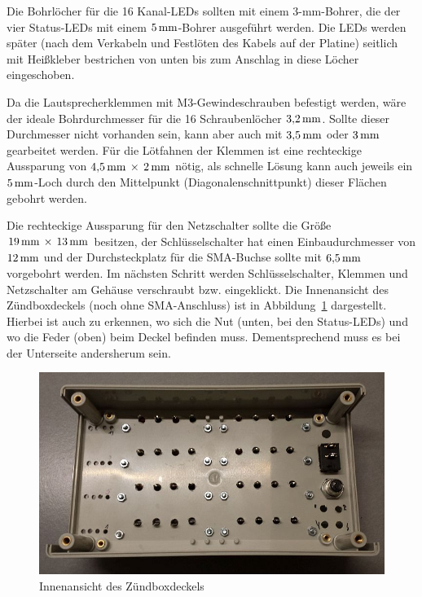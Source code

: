 \documentclass[pdftex, parskip, numbers=noenddot, toc=listof]{scrbook}
\begin{document}
	Die Bohrlöcher für die 16 Kanal-LEDs sollten mit einem 3-mm-Bohrer, die der vier Status-LEDs mit einem $\unit[5]{mm}$-Bohrer ausgeführt werden. Die LEDs werden später (nach dem Verkabeln und Festlöten des Kabels auf der Platine) seitlich mit Heißkleber bestrichen von unten bis zum Anschlag in diese Löcher eingeschoben.

	Da die Lautsprecherklemmen mit M3-Gewindeschrauben befestigt werden, wäre der ideale Bohrdurchmesser für die 16 Schraubenlöcher $\unit[3{,}2]{mm}$. Sollte dieser Durchmesser nicht vorhanden sein, kann aber auch mit $\unit[3{,}5]{mm}$ oder $\unit[3]{mm}$ gearbeitet werden. Für die Lötfahnen der Klemmen ist eine rechteckige Aussparung von $\unit[4{,}5]{mm}\,\times\,\unit[2]{mm}$ nötig, als schnelle Lösung kann auch jeweils ein $\unit[5]{mm}$-Loch durch den Mittelpunkt (Diagonalenschnittpunkt) dieser Flächen gebohrt werden.

	Die rechteckige Aussparung für den Netzschalter sollte die Größe $\unit[19]{mm}\,\times\,\unit[13]{mm}$ besitzen, der Schlüsselschalter hat einen Einbaudurchmesser von $\unit[12]{mm}$ und der Durchsteckplatz für die SMA-Buchse sollte mit $\unit[6{,}5]{mm}$ vorgebohrt werden. Im nächsten Schritt werden Schlüsselschalter, Klemmen und Netzschalter am Gehäuse verschraubt bzw. eingeklickt. Die Innenansicht des Zündboxdeckels (noch ohne SMA-Anschluss) ist in Abbildung~\ref{fig:zuendboxdeckel} dargestellt. Hierbei ist auch zu erkennen, wo sich die Nut (unten, bei den Status-LEDs) und wo die Feder (oben) beim Deckel befinden muss. Dementsprechend muss es bei der Unterseite andersherum sein.

	\begin{figure}
		\centering
		\includegraphics[width=\textwidth]{bilder/zuendboxdeckel}
		\caption{Innenansicht des Zündboxdeckels}
		\label{fig:zuendboxdeckel}
	\end{figure}
\end{document}
